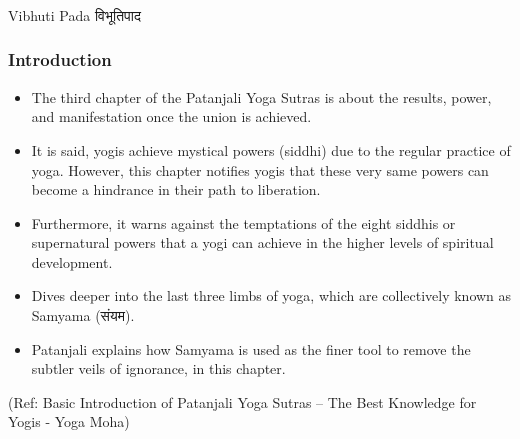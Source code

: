 \begin{frame}[fragile]\frametitle{}
\begin{center}
{\Large Vibhuti Pada विभूतिपाद}
\end{center}
\end{frame}


\begin{frame}[fragile]\frametitle{Introduction}


	\begin{itemize}
	\item The third chapter of the Patanjali Yoga Sutras is about the results, power, and manifestation once the union is achieved. 
		\item It is said, yogis achieve mystical powers (siddhi) due to the regular practice of yoga. However, this chapter notifies yogis that these very same powers can become a hindrance in their path to liberation. 
			\item Furthermore, it warns against the temptations of the eight siddhis or supernatural powers that a yogi can achieve in the higher levels of spiritual development.
	\item Dives deeper into the last three limbs of yoga, which are collectively known as Samyama (संयम).
	\item Patanjali explains how Samyama is used as the finer tool to remove the subtler veils of ignorance, in this chapter.
	\end{itemize}

\tiny{(Ref: Basic Introduction of Patanjali Yoga Sutras – The Best Knowledge for Yogis - Yoga Moha)}

\end{frame}
